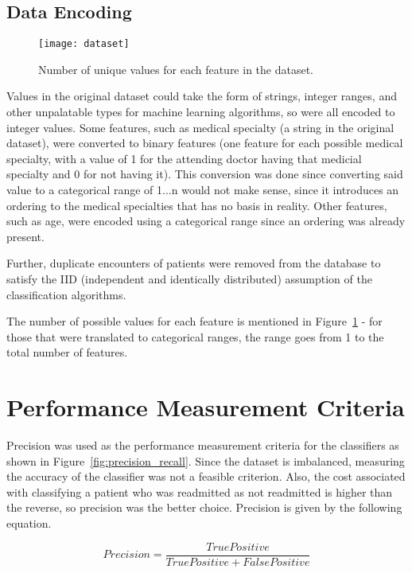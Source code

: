 \documentclass[conference]{IEEEtran}
\begin{document}
\subsection{Data Encoding}

\begin{figure}[htpb]
	\centering
	\texttt{[image: dataset]}
	\caption{Number of unique values for each feature in the dataset.}
	\label{fig:dataset}
\end{figure}

Values in the original dataset could take the form of strings, integer ranges, and other unpalatable types for machine learning algorithms, so were all encoded to integer values. Some features, such as medical specialty (a string in the original dataset), were converted to binary features (one feature for each possible medical specialty, with a value of 1 for the attending doctor having that medicial specialty and 0 for not having it). This conversion was done since converting said value to a categorical range of 1...n would not make sense, since it introduces an ordering to the medical specialties that has no basis in reality. Other features, such as age, were encoded using a categorical range since an ordering was already present.

Further, duplicate encounters of patients were removed from the database to satisfy the IID (independent and identically distributed) assumption of the classification algorithms.

The number of possible values for each feature is mentioned in Figure~\ref{fig:dataset} - for those that were translated to categorical ranges, the range goes from 1 to the total number of features.

\section{Performance Measurement Criteria}

Precision was used as the performance measurement criteria for the classifiers as shown in Figure~\ref{fig:precision_recall}. Since the dataset is imbalanced, measuring the accuracy of the classifier was not a feasible criterion. Also, the cost associated with classifying a patient who was readmitted as not readmitted is higher than the reverse, so precision was the better choice. Precision is given by the following equation.

\[ Precision = \frac{True Positive}{True Positive + False Positive} \]
\end{document}
